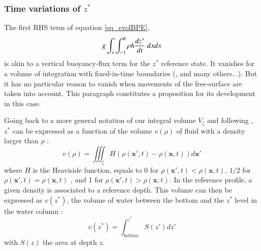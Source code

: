 \subsubsection{Time variations of $z^*$}
The first RHS term of equation \ref{eq_evolBPE}, 
\begin{equation}
\label{RHS_BPE_1}
g\int_{x} \int_{-1}^0 \rho h \frac{d z^*}{d t}\ dx ds \\
\end{equation}
is akin to a vertical buoyancy-flux term for the $z^*$ reference state. It vanishes for a volume of integration with fixed-in-time boundaries (\cite{winters_available_1995}, \cite{huang_mixing_1998} and many others...). But it has no particular reason to vanish when movements of the free-surface are taken into account. This paragraph constitutes a proposition for its development in this case.

Going back to a more general notation of our integral volume $V_{\zeta}$ and following \citet{huang_mixing_1998}, $z^*$ can be expressed as a function of the volume $v(\rho)$ of fluid with a density larger than $\rho$ :
\begin{equation}
v(\rho)=\iiint_{\zeta} H(\rho(\mathbf{x}',t)-\rho(\mathbf{x},t))d\mathbf{x}' %
\end{equation}
where $H$ is the Heaviside function, equals to 0 for $\rho(\mathbf{x}',t)<\rho(\mathbf{x},t)$, $1/2$ for $\rho(\mathbf{x}',t)=\rho(\mathbf{x},t)$ , and 1 for $\rho(\mathbf{x}',t)>\rho(\mathbf{x},t)$.
In the reference profile, a given density is associated to a reference depth. This volume can then be expressed as $v(z^*)$, the volume of water between the bottom and the $z^*$ level in the water column :
\begin{equation}
v(z^*)=\int^{z^*}_{bottom} S(z')dz'
\end{equation}
with $S(z)$ the area at depth $z$.


